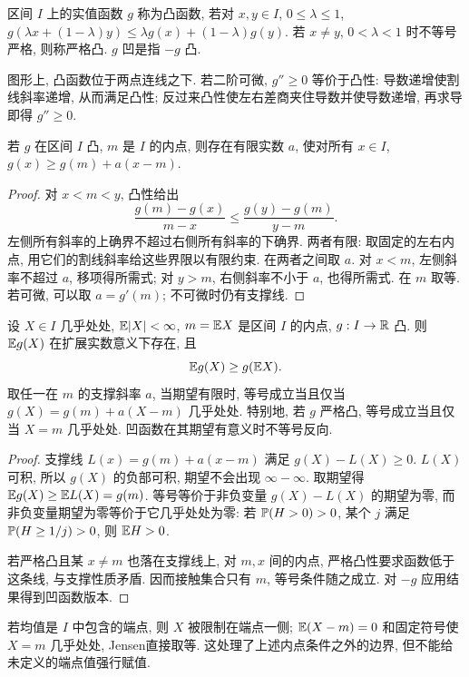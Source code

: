 \begin{definition}
区间 $I$ 上的实值函数 $g$ 称为凸函数, 若对 $x,y\in I$, $0\leq\lambda\leq1$,
$g(\lambda x+(1-\lambda)y)\leq\lambda g(x)+(1-\lambda)g(y)$. 若 $x\ne y$, $0<\lambda<1$ 时不等号严格, 则称严格凸. $g$ 凹是指 $-g$ 凸.
\end{definition}
图形上, 凸函数位于两点连线之下. 若二阶可微, $g''\geq0$ 等价于凸性: 导数递增使割线斜率递增, 从而满足凸性; 反过来凸性使左右差商夹住导数并使导数递增, 再求导即得 $g''\geq0$.
\begin{lemma}[支撑直线]
若 $g$ 在区间 $I$ 凸, $m$ 是 $I$ 的内点, 则存在有限实数 $a$, 使对所有 $x\in I$,
$g(x)\geq g(m)+a(x-m)$.
\end{lemma}
\begin{proof}
对 $x<m<y$, 凸性给出
\[\frac{g(m)-g(x)}{m-x}\leq\frac{g(y)-g(m)}{y-m}.\]
左侧所有斜率的上确界不超过右侧所有斜率的下确界. 两者有限: 取固定的左右内点, 用它们的割线斜率给这些界限以有限约束. 在两者之间取 $a$. 对 $x<m$, 左侧斜率不超过 $a$, 移项得所需式; 对 $y>m$, 右侧斜率不小于 $a$, 也得所需式. 在 $m$ 取等. 若可微, 可以取 $a=g'(m)$; 不可微时仍有支撑线.
\end{proof}
\begin{theorem}[Jensen不等式]
设 $X\in I$ 几乎处处, $\mathbb E|X|<\infty$, $m=\mathbb E X$ 是区间 $I$ 的内点, $g:I\to\mathbb R$ 凸. 则 $\mathbb E g(X)$ 在扩展实数意义下存在, 且
\[\mathbb E g(X)\geq g(\mathbb E X).\]
取任一在 $m$ 的支撑斜率 $a$, 当期望有限时, 等号成立当且仅当
$g(X)=g(m)+a(X-m)$ 几乎处处. 特别地, 若 $g$ 严格凸, 等号成立当且仅当 $X=m$ 几乎处处. 凹函数在其期望有意义时不等号反向.
\end{theorem}
\begin{proof}
支撑线 $L(x)=g(m)+a(x-m)$ 满足 $g(X)-L(X)\geq0$. $L(X)$ 可积, 所以 $g(X)$ 的负部可积, 期望不会出现 $\infty-\infty$. 取期望得
$\mathbb E g(X)\geq\mathbb E L(X)=g(m)$. 等号等价于非负变量 $g(X)-L(X)$ 的期望为零, 而非负变量期望为零等价于它几乎处处为零: 若 $\mathbb P(H>0)>0$, 某个 $j$ 满足 $\mathbb P(H\geq1/j)>0$, 则 $\mathbb E H>0$.

若严格凸且某 $x\ne m$ 也落在支撑线上, 对 $m,x$ 间的内点, 严格凸性要求函数低于这条线, 与支撑性质矛盾. 因而接触集合只有 $m$, 等号条件随之成立. 对 $-g$ 应用结果得到凹函数版本.
\end{proof}
若均值是 $I$ 中包含的端点, 则 $X$ 被限制在端点一侧; $\mathbb E(X-m)=0$ 和固定符号使 $X=m$ 几乎处处, Jensen直接取等. 这处理了上述内点条件之外的边界, 但不能给未定义的端点值强行赋值.


